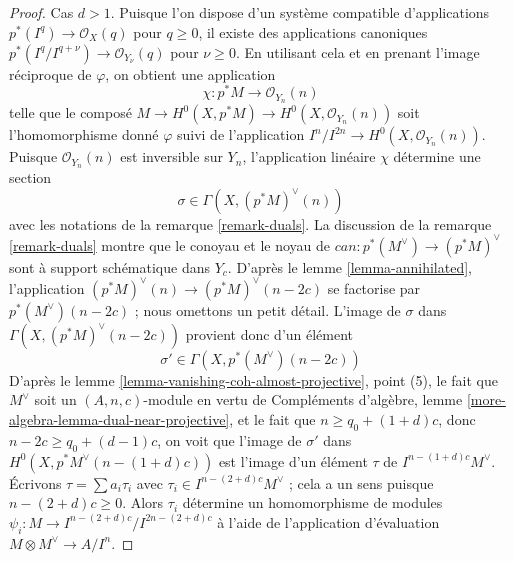 \begin{proof}
Cas $d > 1$. Puisque l'on dispose d'un système compatible d'applications $p^*(I^q) \to \mathcal{O}_X(q)$ pour $q \geq 0$, il existe des applications canoniques $p^*(I^q/I^{q + \nu}) \to \mathcal{O}_{Y_\nu}(q)$ pour $\nu \geq 0$. En utilisant cela et en prenant l'image réciproque de $\varphi$, on obtient une application
$$
\chi : p^*M \longrightarrow \mathcal{O}_{Y_n}(n)
$$
telle que le composé $M \to H^0(X, p^*M) \to H^0(X, \mathcal{O}_{Y_n}(n))$ soit l'homomorphisme donné $\varphi$ suivi de l'application $I^n/I^{2n} \to H^0(X, \mathcal{O}_{Y_n}(n))$. Puisque $\mathcal{O}_{Y_n}(n)$ est inversible sur $Y_n$, l'application linéaire $\chi$ détermine une section
$$
\sigma \in \Gamma(X, (p^*M)^\vee(n))
$$
avec les notations de la remarque \ref{remark-duals}. La discussion de la remarque \ref{remark-duals} montre que le conoyau et le noyau de $can : p^*(M^\vee) \to (p^*M)^\vee$ sont à support schématique dans $Y_c$. D'après le lemme \ref{lemma-annihilated}, l'application $(p^*M)^\vee(n) \to (p^*M)^\vee(n - 2c)$ se factorise par $p^*(M^\vee)(n - 2c)$ ; nous omettons un petit détail. L'image de $\sigma$ dans $\Gamma(X, (p^*M)^\vee(n - 2c))$ provient donc d'un élément
$$
\sigma' \in \Gamma(X, p^*(M^\vee)(n - 2c))
$$
D'après le lemme \ref{lemma-vanishing-coh-almost-projective}, point (5), le fait que $M^\vee$ soit un $(A, n, c)$-module en vertu de Compléments d'algèbre, lemme \ref{more-algebra-lemma-dual-near-projective}, et le fait que $n \geq q_0 + (1 + d)c$, donc $n - 2c \geq q_0 + (d - 1)c$, on voit que l'image de $\sigma'$ dans $H^0(X, p^*M^\vee(n - (1 + d)c))$ est l'image d'un élément $\tau$ de $I^{n - (1 + d)c}M^\vee$. Écrivons $\tau = \sum a_i \tau_i$ avec $\tau_i \in I^{n - (2 + d)c}M^\vee$ ; cela a un sens puisque $n - (2 + d)c \geq 0$. Alors $\tau_i$ détermine un homomorphisme de modules $\psi_i : M \to I^{n - (2 + d)c}/I^{2n - (2 + d)c}$ à l'aide de l'application d'évaluation $M \otimes M^\vee \to A/I^n$.


\end{proof}
